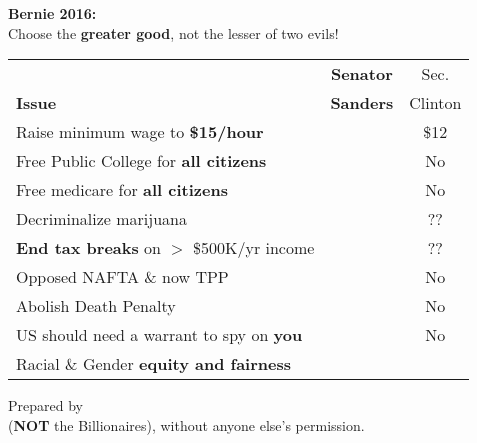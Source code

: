 \newcommand{\checkbox}{\makebox[0pt][l]{$\square$}\raisebox{.15ex}{\hspace{0.1em}$\checkmark$}}
\setlength{\baselineskip}{8.25pt}
\vspace{-11pt}

\begin{center}
  {\Huge\bf Bernie 2016:}\\

  {\small Choose the {\bf greater good}, not the lesser of two evils!}\\[5pt]

  \begin{tabular}{l|@{\hskip 1pt}c@{\hskip 1pt}|@{\hskip 1pt}c}
\setlength{\tabcolsep}{0pt}
                  & {\bf\small Senator} & Sec.      \\
\bf Issue         & {\bf\small Sanders} & Clinton \\
\hline
Raise minimum wage to {\bf \$15/hour}            & \checkbox &  \$12     \\	
Free Public College for {\bf all citizens}       & \checkbox &  No       \\
Free medicare for {\bf all citizens}             & \checkbox &  No       \\
Decriminalize marijuana                          & \checkbox &  ??       \\
{\bf End tax breaks} on $>$ \$500K/yr income     & \checkbox &  ??       \\
Opposed NAFTA \& now TPP                         & \checkbox &  No       \\
Abolish Death Penalty                            & \checkbox &  No       \\
US should need a warrant to spy on {\bf you}     & \checkbox &  No       \\
Racial \& Gender {\bf equity and fairness}       & \checkbox & \checkbox \\

  \end{tabular}
\vspace{-9pt}
\begin{framed}
\small Prepared by \GroupName\\
({\bf NOT} the Billionaires), without anyone else's permission.\\
{\tt \GroupURL}
\end{framed}
\end{center}
\vspace{-18pt}
